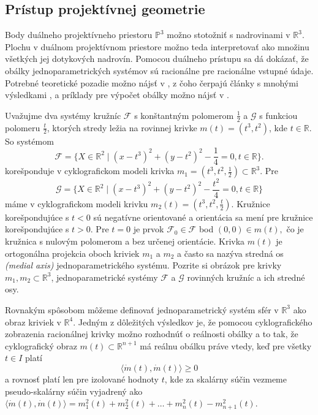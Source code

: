 \subsection{Prístup projektívnej geometrie}
Body duálneho projektívneho priestoru $\mathbb{P}^3 $ možno stotožniť s nadrovinami v $\mathbb{R}^3$. Plochu v duálnom projektívnom priestore možno teda interpretovať ako množinu všetkých jej dotykových nadrovín. Pomocou duálneho prístupu sa dá dokázať, že obálky jednoparametrických systémov sú racionálne pre racionálne vstupné údaje. Potrebné teoretické pozadie možno nájsť v \cite{Pott01}, z čoho čerpajú články s mnohými výsledkami \cite{Pet08}, \cite{Pet98} a príklady pre výpočet obálky možno nájsť v \cite{Vra22}.
\begin{example}
Uvažujme dva systémy kružníc $\mathcal{F}$ s konštantným polomerom $\frac{1}{2}$ a $\mathcal{G}$ s funkciou polomeru $\frac{t}{2}$, ktorých stredy ležia na rovinnej krivke $m(t) = (t^3, t^2)$, kde $t \in \mathbb{R}.$
So systémom
$$ \mathcal{F} = \{ X \in \mathbb{R}^2 \mid (x - t^3)^2 + (y - t^2)^2 - \frac{1}{4} = 0, t \in \mathbb{R} \}.$$
korešponduje v cyklografickom modeli krivka $m_1 = (t^3, t^2, \frac{1}{2})\subset \mathbb{R}^3$.
Pre
$$ \mathcal{G} = \{ X \in \mathbb{R}^2 \mid (x - t^3)^2 + (y - t^2)^2 - \frac{t^2}{4} = 0, t \in \mathbb{R} \}$$
máme v cyklografickom modeli krivku $m_2(t) = (t^3, t^2, \frac{t}{2}).$
Kružnice korešpondujúce s $t < 0$ sú negatívne orientované a orientácia sa mení pre kružnice korešpondujúce s $t > 0$. Pre $t = 0$ je prvok $\mathcal{F}_0 \in \mathcal{F}$ bod $ (0, 0) \in m(t), $ čo je kružnica s nulovým polomerom a bez určenej orientácie.
Krivka $m(t)$ je ortogonálna projekcia oboch kriviek $m_1$ a $m_2$ a často sa nazýva stredná os \textit{(medial axis)} jednoparametrického systému.
Pozrite si obrázok pre krivky $m_1, m_2 \subset \mathbb{R}^3$, jednoparametrické systémy $\mathcal{F}$ a $\mathcal{G}$ rovinných kružníc a ich stredné osy.
\end{example}

Rovnakým spôsobom môžeme definovať jednoparametrický systém sfér v $\mathbb{R}^3$ ako obraz kriviek v $\mathbb{R}^4$.
Jedným z dôležitých výsledkov je, že pomocou cyklografického zobrazenia racionálnej krivky možno rozhodnúť o reálnosti obálky a to tak, že cyklografický obraz $m(t) \subset \mathbb{R}^{n+1}$ má reálnu obálku práve vtedy, keď pre všetky $t \in I $ platí 
$$\langle \dot{m}(t), \dot{m}(t) \rangle \geq 0$$ 
a rovnosť platí len pre izolované hodnoty $t$, kde za skalárny súčin vezmeme pseudo-skalárny súčin vyjadrený ako $\langle \dot{m}(t), \dot{m}(t) \rangle = m_1^2(t) + m_2^2(t) + \ldots + m_n^2(t) - m_{n+1}^2(t).$

